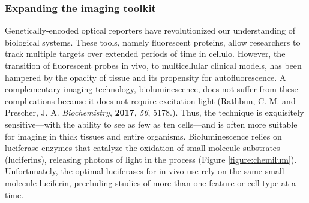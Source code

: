 \documentclass[11pt]{article}
\begin{document}
\subsubsection*{Expanding the imaging toolkit}
Genetically-encoded optical reporters have revolutionized our understanding of biological systems. These tools, namely fluorescent proteins, allow researchers to track multiple targets over extended periods of time in cellulo. However, the transition of fluorescent probes in vivo, to multicellular clinical models, has been hampered by the opacity of tissue and its propensity for autofluorescence. A complementary imaging technology, bioluminescence, does not suffer from these complications because it does not require excitation light (Rathbun, C. M. and Prescher, J. A. \textit{Biochemistry}, \textbf{2017}, \textit{56}, 5178.). Thus, the technique is exquisitely sensitive—with the ability to see as few as ten cells—and is often more suitable for imaging in thick tissues and entire organisms. Bioluminescence relies on luciferase enzymes that catalyze the oxidation of small-molecule substrates (luciferins), releasing photons of light in the process (Figure \ref{figure:chemilum}). Unfortunately, the optimal luciferases for in vivo use rely on the same small molecule luciferin, precluding studies of more than one feature or cell type at a time.
\end{document}
